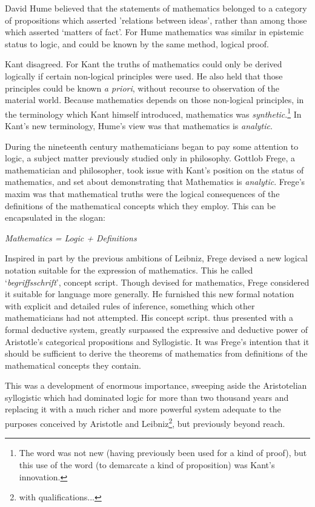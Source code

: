 David Hume believed that the statements of mathematics belonged to a category of propositions which asserted 'relations between ideas', rather than among those which asserted `matters of fact'.
For Hume mathematics was similar in epistemic status to logic, and could be known by the same method, logical proof.

Kant disagreed.
For Kant the truths of mathematics could only be derived logically if certain non-logical principles were used.
He also held that those principles could be known \emph{a priori}, without recourse to observation of the material world.
Because mathematics depends on those non-logical principles, in the terminology which Kant himself introduced, mathematics was \emph{synthetic}.\footnote{The word was not new (having previously been used for a kind of proof), but this use of the word (to demarcate a kind of proposition) was Kant's innovation.}
In Kant's new terminology, Hume's view was that mathematics is \emph{analytic}.

During the nineteenth century mathematicians began to pay some attention to logic, a subject matter previously studied only in philosophy.
Gottlob Frege, a mathematician and philosopher, took issue with Kant's position on the status of mathematics, and set about demonstrating that Mathematics is \emph{analytic}.
Frege's maxim was that mathematical truths were the logical consequences of the definitions of the mathematical concepts which they employ.
This can be encapsulated in the slogan:

\begin{center}
  {\it Mathematics = Logic + Definitions}
\end{center}

  
Inspired in part by the previous ambitions of Leibniz, Frege devised a new logical notation suitable for the expression of mathematics.
This he called `\emph{begriffsschrift}', concept script.
Though devised for mathematics, Frege considered it suitable for language more generally.
He furnished this new formal notation with explicit and detailed rules of inference, something which other mathematicians had not attempted.
His concept script. thus presented with a formal deductive system, greatly surpassed the expressive and deductive power of Aristotle's categorical propositions and Syllogistic.
It was Frege's intention that it should be sufficient to derive the theorems of mathematics from definitions of the mathematical concepts they contain.

This was a development of enormous importance, sweeping aside the Aristotelian syllogistic which had dominated logic for more than two thousand years and replacing it with a much richer and more powerful system adequate to the purposes conceived by Aristotle and Leibniz\footnote{with qualifications...}, but previously beyond reach.

